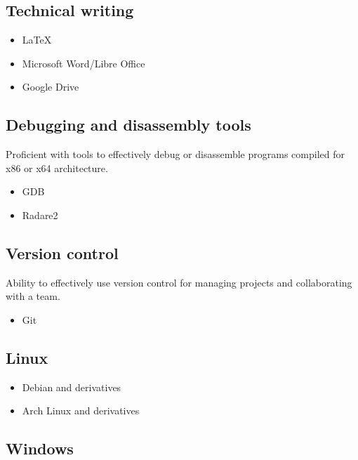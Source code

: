 \documentclass[letterpaper]{article}
\begin{document}
        \subsection*{Technical writing}

        \begin{itemize}[itemsep = 0pt]
            \item LaTeX
            \item Microsoft Word/Libre Office
            \item Google Drive
        \end{itemize}

        \subsection*{Debugging and disassembly tools}
        Proficient with tools to effectively debug or disassemble programs compiled for x86 or x64 architecture.

        \begin{itemize}[itemsep = 0pt]
            \item GDB
            \item Radare2
        \end{itemize}

        \subsection*{Version control}
        Ability to effectively use version control for managing projects and collaborating with a team.

        \begin{itemize}[itemsep = 0pt]
            \item Git
        \end{itemize}

        \subsection*{Linux}

        \begin{itemize}[itemsep = 0pt]
            \item Debian and derivatives
            \item Arch Linux and derivatives
        \end{itemize}

        \subsection*{Windows}
\end{document}
